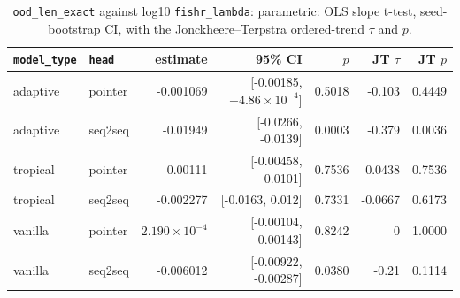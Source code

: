 \documentclass[10pt]{article}
\begin{document}
{\small
\begin{longtable}{llrrrrr}
\caption{\texttt{ood\_len\_exact} against log10 \texttt{fishr\_lambda}: parametric: OLS slope t-test, seed-bootstrap CI, with the Jonckheere--Terpstra ordered-trend $\tau$ and $p$.}\label{tab:trend-ood_len_exact}\\
\toprule
\texttt{model\_type} & \texttt{head} & estimate & 95\% CI & $p$ & JT $\tau$ & JT $p$\\
\midrule
\endhead
adaptive & pointer & -0.001069 & [-0.00185, $-4.86\times10^{-4}$] & 0.5018 & -0.103 & 0.4449\\
adaptive & seq2seq & -0.01949 & [-0.0266, -0.0139] & 0.0003 & -0.379 & 0.0036\\
tropical & pointer & 0.00111 & [-0.00458, 0.0101] & 0.7536 & 0.0438 & 0.7536\\
tropical & seq2seq & -0.002277 & [-0.0163, 0.012] & 0.7331 & -0.0667 & 0.6173\\
vanilla & pointer & $2.190\times10^{-4}$ & [-0.00104, 0.00143] & 0.8242 & 0 & 1.0000\\
vanilla & seq2seq & -0.006012 & [-0.00922, -0.00287] & 0.0380 & -0.21 & 0.1114\\
\bottomrule
\end{longtable}
}
\end{document}
